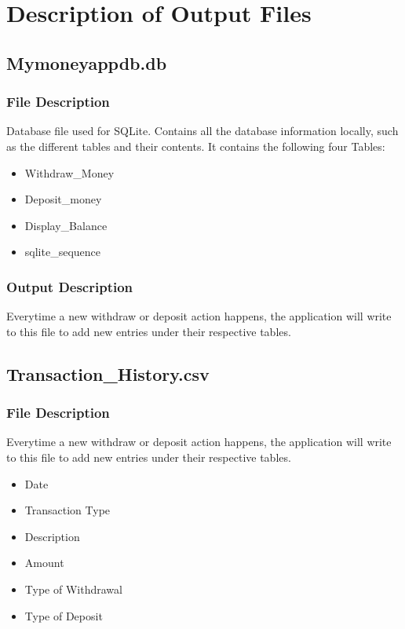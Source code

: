 \documentclass[12pt]{article}
\begin{document}
\section{Description of Output Files}

\subsection{Mymoneyappdb.db}

\subsubsection{File Description}
Database file used for SQLite. Contains all the database information locally, such as the different tables and their contents. It contains the following four Tables:
\begin{itemize}
  \item Withdraw\_Money
  \item Deposit\_money
  \item Display\_Balance
  \item sqlite\_sequence
\end{itemize}

\subsubsection{Output Description}
Everytime a new withdraw or deposit action happens, the application will write to this file to add new entries under their respective tables.  

\subsection{Transaction\_History.csv}

\subsubsection{File Description}
Everytime a new withdraw or deposit action happens, the application will write to this file to add new entries under their respective tables.  
\begin{itemize}
  \item Date
  \item Transaction Type
  \item Description
  \item Amount
  \item Type of Withdrawal
  \item Type of Deposit
\end{itemize}
\end{document}
